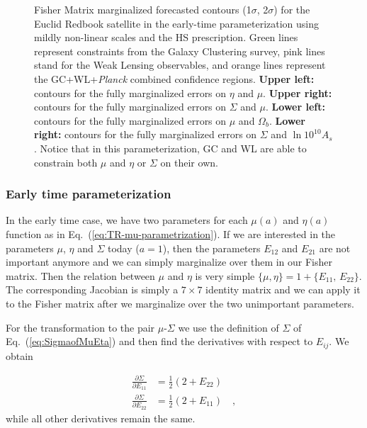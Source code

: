 \begin{figure}[htbp]
\caption[1$\sigma$ marginalized confidence contours for Euclid GC, WL and Planck in the eraly-time parameterization.]{\label{fig:T-related-ellipses-mu-omegac} Fisher Matrix marginalized forecasted contours
(1$\sigma$, 2$\sigma$) for the Euclid Redbook satellite in the early-time
parameterization using mildly non-linear scales and the HS prescription.
Green lines represent constraints from the Galaxy Clustering survey,
pink lines stand for the Weak Lensing observables, and orange lines represent the
 GC+WL+{\it Planck} combined confidence
regions. \textbf{Upper left: }contours for the fully marginalized
errors on $\eta$ and $\mu$. \textbf{Upper right: }contours for the
fully marginalized errors on $\Sigma$ and $\mu$.\textbf{ Lower left:
}contours for the fully marginalized errors on $\mu$ and $\Omega_{b}$.
\textbf{Lower right: }contours for the fully marginalized errors on
$\Sigma$ and $\ln 10^{10} A_s$. Notice that in this parameterization, GC and WL are able to constrain both $\mu$ and
$\eta$ or $\Sigma$ on their own.}
\end{figure}

\subsubsection{Early time parameterization}

In the early time case, we have two parameters for each $\mu(a)$
and $\eta(a)$ function as in Eq.\ (\ref{eq:TR-mu-parametrization}).
If we are interested in the parameters $\mu$, $\eta$ and $\Sigma$
today ($a=1$), then the parameters $E_{12}$ and $E_{21}$ are not
important anymore and we can simply marginalize over them in our Fisher
matrix. Then the relation between $\mu$ and $\eta$ is very simple
$\{\mu,\eta\}=1+\{E_{11},\,E_{22}\}$. The corresponding Jacobian
is simply a $7\times7$ identity matrix and we can apply it to the
Fisher matrix after we marginalize over the two unimportant parameters.

For the transformation to the pair $\mu$-$\Sigma$ we use the definition
of $\Sigma$ of Eq.\ (\ref{eq:SigmaofMuEta}) and then find the derivatives
with respect to $E_{ij}$. We obtain

\begin{align}
\frac{\partial\Sigma}{\partial E_{11}} & =\frac{1}{2}(2+E_{22})\\
\frac{\partial\Sigma}{\partial E_{22}} & =\frac{1}{2}(2+E_{11})\quad,
\end{align}
while all other derivatives remain the same.



